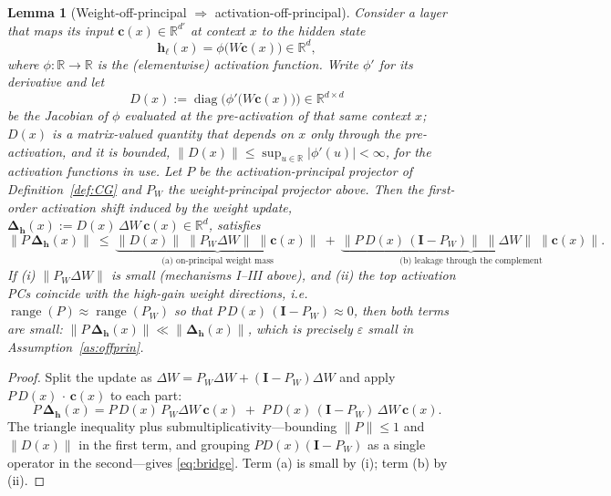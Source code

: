 \documentclass[11pt]{article}
\newtheorem{lemma}{Lemma}[section]
\DeclareMathOperator{\diag}{diag}
\newcommand{\R}{\mathbb{R}}
\newcommand{\bh}{\mathbf{h}}
\newcommand{\bc}{\mathbf{c}}
\newcommand{\bI}{\mathbf{I}}
\newcommand{\bDelta}{\bm{\Delta}}
\newcommand{\Dh}{\bDelta_{\bh}}      %
\newcommand{\PW}{P_W}                 %
\begin{document}
\begin{lemma}[Weight-off-principal $\Rightarrow$ activation-off-principal]\label{lem:bridge}
Consider a layer that maps its input $\bc(x)\in\R^{d'}$ at context $x$ to the hidden state
\begin{equation*}
\bh_\ell(x)=\phi\big(W\bc(x)\big)\in\R^{d},
\end{equation*}
where $\phi:\R\to\R$ is the (elementwise) activation function. Write $\phi'$ for its derivative and
let
\begin{equation*}
D(x):=\diag\Big(\phi'\big(W\bc(x)\big)\Big)\in\R^{d\times d}
\end{equation*}
be the Jacobian of $\phi$ evaluated at the pre-activation of that same context $x$; $D(x)$ is a
matrix-valued quantity that depends on $x$ only through the pre-activation, and it is bounded,
$\|D(x)\|\le\sup_{u\in\R}|\phi'(u)|<\infty$, for the activation functions in use. Let $P$ be the
activation-principal projector
of Definition~\ref{def:CG} and $\PW$ the weight-principal projector above. Then the first-order
activation shift induced by the weight update, $\Dh(x):=D(x)\,\Delta W\,\bc(x)\in\R^d$, satisfies
\begin{equation}\label{eq:bridge}
\big\|P\,\Dh(x)\big\|
\ \le\ \underbrace{\|D(x)\|\;\big\|\PW\Delta W\big\|\;\|\bc(x)\|}_{\text{(a) on-principal weight mass}}
\ +\ \underbrace{\big\|P\,D(x)\,(\bI-\PW)\big\|\;\big\|\Delta W\big\|\;\|\bc(x)\|}_{\text{(b) leakage through the complement}} .
\end{equation}
If (i) $\|\PW\Delta W\|$ is small (mechanisms I--III above), and (ii) the top activation PCs coincide
with the high-gain weight directions, i.e.\ $\operatorname{range}(P)\approx\operatorname{range}(\PW)$
so that $P\,D(x)\,(\bI-\PW)\approx0$, then both terms are small: $\|P\,\Dh(x)\|\ll\|\Dh(x)\|$, which
is precisely $\varepsilon$ small in Assumption~\ref{as:offprin}.
\end{lemma}
\begin{proof}
Split the update as $\Delta W=\PW\Delta W+(\bI-\PW)\Delta W$ and apply $P\,D(x)\,\cdot\,\bc(x)$ to
each part:
\begin{equation*}
P\,\Dh(x)=P\,D(x)\,\PW\Delta W\,\bc(x)\;+\;P\,D(x)\,(\bI-\PW)\,\Delta W\,\bc(x).
\end{equation*}
The triangle inequality plus submultiplicativity---bounding $\|P\|\le1$ and $\|D(x)\|$ in the first
term, and grouping $P D(x)(\bI-\PW)$ as a single operator in the second---gives \eqref{eq:bridge}.
Term (a) is small by (i); term (b) by (ii).
\end{proof}
\end{document}
